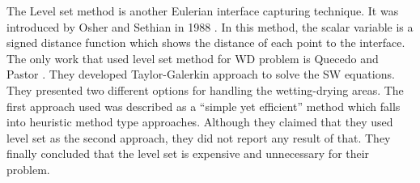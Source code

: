\documentclass[letterpaper,10pt]{article}
\begin{document}
The Level set method is another Eulerian interface capturing technique. It was introduced by Osher and Sethian in 1988 \cite{Osher1988}. In this method, the scalar variable is a signed distance function which shows the distance of each point to the interface. 
The only work that used level set method for WD problem is Quecedo and Pastor \cite{quecedo2002rtg}. They developed Taylor-Galerkin approach to solve the SW equations. They presented two different options for handling the wetting-drying areas. The first approach used was described as a ``simple yet efficient'' method which falls into heuristic method type approaches. Although they claimed that they used level set as the second approach, they did not report any result of that.
They finally concluded that the level set is expensive and unnecessary for their problem.\newline



\end{document}
